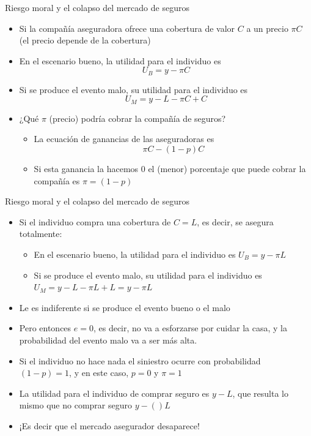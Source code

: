 \documentclass{beamer}
\begin{document}
\begin{frame}{Riesgo moral y el colapso del mercado de seguros}
    \begin{itemize}
        \item Si la compañía aseguradora ofrece una cobertura de valor $C$ a un precio $\pi C$ (el precio depende de la cobertura) \vspace{2mm}
        \item En el escenario bueno, la utilidad para el individuo es
        \begin{equation*}
            U_B = y - \pi C
        \end{equation*}
        \item Si se produce el evento malo, su utilidad para el individuo es
        \begin{equation*}
            U_M = y - L - \pi C + C
        \end{equation*}
        \item ¿Qué $\pi$ (precio) podría cobrar la compañía de seguros?
        \begin{itemize}
        \item La ecuación de ganancias de las aseguradoras es
        \begin{equation*}
            \pi C - (1-p) C
        \end{equation*}
        \item Si esta ganancia la hacemos $0$ el (menor) porcentaje que puede cobrar la compañía es $\pi=(1-p)$
        \end{itemize}
    \end{itemize}
\end{frame}

\begin{frame}{Riesgo moral y el colapso del mercado de seguros}
    \begin{itemize}
        \item Si el individuo compra una cobertura de $C=L$, es decir, se asegura totalmente:
        \begin{itemize}
        \item En el escenario bueno, la utilidad para el individuo es 
        $U_B = y - \pi L$
        \item Si se produce el evento malo, su utilidad para el individuo es 
        $U_M = y - L - \pi L + L = y - \pi L$ 
        \end{itemize}
        \item Le es indiferente si se produce el evento bueno o el malo 
        \item Pero entonces $e=0$, es decir, no va a esforzarse por cuidar la casa, y la probabilidad del evento malo va a ser más alta.
        \item Si el individuo no hace nada el siniestro ocurre con probabilidad $(1-p)=1$, y en este caso, $p=0$ y $\pi=1$
        \item La utilidad para el individuo de comprar seguro es $y - L$, que resulta lo mismo que no comprar seguro $y - () L$
        \item ¡Es decir que el mercado asegurador desaparece!
    \end{itemize}   
\end{frame}
\end{document}
